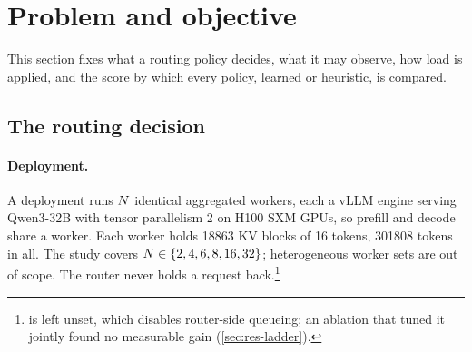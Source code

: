 %

\section{Problem and objective}
\label{sec:setup}

This section fixes what a routing policy decides, what it may observe, how load is applied, and the
score by which every policy, learned or heuristic, is compared.

\subsection{The routing decision}
\label{sec:decision}

\paragraph{Deployment.}
A deployment runs $N$ identical aggregated workers, each a vLLM engine serving Qwen3-32B with
tensor parallelism 2 on H100 SXM GPUs, so prefill and decode share a worker. Each worker holds
\num{18863} KV blocks of 16 tokens, \num{301808} tokens in all. The study covers
$N \in \{2, 4, 6, 8, 16, 32\}$; heterogeneous worker sets are out of scope.
The router never holds a request back.\footnote{ is left unset, which
  disables router-side queueing; an ablation that tuned it jointly found no measurable gain
  (\cref{sec:res-ladder}).}

